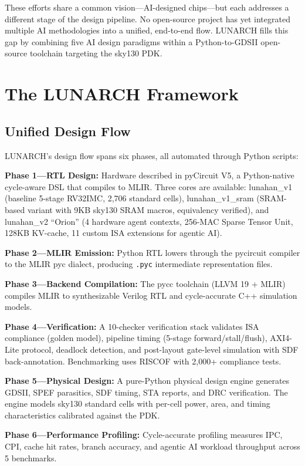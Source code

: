 \documentclass[conference]{IEEEtran}
\begin{document}
These efforts share a common vision---AI-designed chips---but each addresses a different stage of the design pipeline. No open-source project has yet integrated multiple AI methodologies into a unified, end-to-end flow. LUNARCH fills this gap by combining five AI design paradigms within a Python-to-GDSII open-source toolchain targeting the sky130 PDK.

\section{The LUNARCH Framework}

\subsection{Unified Design Flow}
LUNARCH's design flow spans six phases, all automated through Python scripts:

\textbf{Phase 1---RTL Design:} Hardware described in pyCircuit V5, a Python-native cycle-aware DSL that compiles to MLIR. Three cores are available: lunahan\_v1 (baseline 5-stage RV32IMC, 2,706 standard cells), lunahan\_v1\_sram (SRAM-based variant with 9KB sky130 SRAM macros, equivalency verified), and lunahan\_v2 ``Orion'' (4 hardware agent contexts, 256-MAC Sparse Tensor Unit, 128KB KV-cache, 11 custom ISA extensions for agentic AI).

\textbf{Phase 2---MLIR Emission:} Python RTL lowers through the pycircuit compiler to the MLIR pyc dialect, producing \texttt{.pyc} intermediate representation files.

\textbf{Phase 3---Backend Compilation:} The pycc toolchain (LLVM 19 + MLIR) compiles MLIR to synthesizable Verilog RTL and cycle-accurate C++ simulation models.

\textbf{Phase 4---Verification:} A 10-checker verification stack validates ISA compliance (golden model), pipeline timing (5-stage forward/stall/flush), AXI4-Lite protocol, deadlock detection, and post-layout gate-level simulation with SDF back-annotation. Benchmarking uses RISCOF with 2,000+ compliance tests.

\textbf{Phase 5---Physical Design:} A pure-Python physical design engine generates GDSII, SPEF parasitics, SDF timing, STA reports, and DRC verification. The engine models sky130 standard cells with per-cell power, area, and timing characteristics calibrated against the PDK.

\textbf{Phase 6---Performance Profiling:} Cycle-accurate profiling measures IPC, CPI, cache hit rates, branch accuracy, and agentic AI workload throughput across 5 benchmarks.
\end{document}
